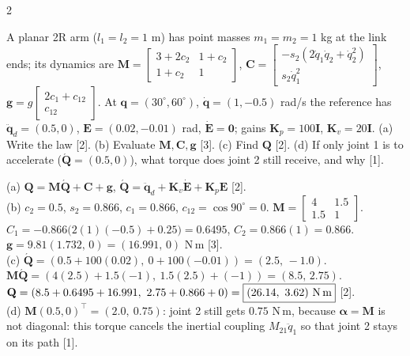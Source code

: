 \begin{multicols}{2}
\begin{examq}
A planar 2R arm ($l_1=l_2=1$ m) has point masses $m_1=m_2=1$ kg at the link ends; its dynamics are $\mathbf M=\begin{bmatrix}3+2c_2&1+c_2\\1+c_2&1\end{bmatrix}$, $\mathbf C=\begin{bmatrix}-s_2(2\dot q_1\dot q_2+\dot q_2^2)\\s_2\dot q_1^2\end{bmatrix}$, $\mathbf g=g\begin{bmatrix}2c_1+c_{12}\\c_{12}\end{bmatrix}$. At $\mathbf q=(30^\circ,60^\circ)$, $\dot{\mathbf q}=(1,-0.5)$ rad/s the reference has $\ddot{\mathbf q}_d=(0.5,0)$, $\mathbf E=(0.02,-0.01)$ rad, $\dot{\mathbf E}=\mathbf 0$; gains $\mathbf K_p=100\mathbf I$, $\mathbf K_v=20\mathbf I$. (a) Write the law [2]. (b) Evaluate $\mathbf M,\mathbf C,\mathbf g$ [3]. (c) Find $\mathbf Q$ [2]. (d) If only joint 1 is to accelerate ($\acute{\mathbf Q}=(0.5,0)$), what torque does joint 2 still receive, and why [1].
\end{examq}
\begin{examq}[EQ3: solution]
\solution
(a) $\mathbf Q=\mathbf M\acute{\mathbf Q}+\mathbf C+\mathbf g$, $\acute{\mathbf Q}=\ddot{\mathbf q}_d+\mathbf K_v\dot{\mathbf E}+\mathbf K_p\mathbf E$ [2].\\
(b) $c_2=0.5$, $s_2=0.866$, $c_1=0.866$, $c_{12}=\cos90^\circ=0$. $\mathbf M=\begin{bmatrix}4&1.5\\1.5&1\end{bmatrix}$. $C_1=-0.866\big(2(1)(-0.5)+0.25\big)=0.6495$, $C_2=0.866(1)=0.866$. $\mathbf g=9.81(1.732,\,0)=(16.991,\,0)$ N\,m [3].\\
(c) $\acute{\mathbf Q}=(0.5+100(0.02),\ 0+100(-0.01))=(2.5,\,-1.0)$. $\mathbf M\acute{\mathbf Q}=(4(2.5)+1.5(-1),\ 1.5(2.5)+(-1))=(8.5,\,2.75)$. $\mathbf Q=(8.5+0.6495+16.991,\ 2.75+0.866+0)=\boxed{(26.14,\ 3.62)\text{ N\,m}}$ [2].\\
(d) $\mathbf M(0.5,0)^\top=(2.0,\ 0.75)$: joint 2 still gets $0.75$ N\,m, because $\boldsymbol\alpha=\mathbf M$ is not diagonal: this torque cancels the inertial coupling $M_{21}\ddot q_1$ so that joint 2 stays on its path [1]. \chk
\end{examq}


\end{multicols}
